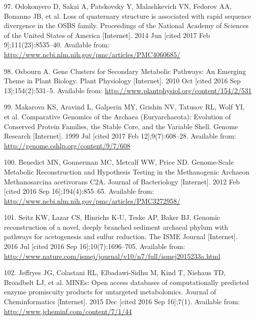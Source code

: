 \documentclass[12pt,twoside]{reedthesis}
\begin{document}
  \hypertarget{ref-odokonyero_loss_2014}{}
  97. Odokonyero D, Sakai A, Patskovsky Y, Malashkevich VN, Fedorov AA,
  Bonanno JB, et al. Loss of quaternary structure is associated with rapid
  sequence divergence in the OSBS family. Proceedings of the National
  Academy of Sciences of the United States of America {[}Internet{]}. 2014
  Jun {[}cited 2017 Feb 9{]};111(23):8535--40. Available from:
  \url{http://www.ncbi.nlm.nih.gov/pmc/articles/PMC4060685/}
  
  \hypertarget{ref-osbourn_gene_2010}{}
  98. Osbourn A. Gene Clusters for Secondary Metabolic Pathways: An
  Emerging Theme in Plant Biology. Plant Physiology {[}Internet{]}. 2010
  Oct {[}cited 2016 Sep 13{]};154(2):531--5. Available from:
  \url{http://www.plantphysiol.org/content/154/2/531}
  
  \hypertarget{ref-makarova_comparative_1999}{}
  99. Makarova KS, Aravind L, Galperin MY, Grishin NV, Tatusov RL, Wolf
  YI, et al. Comparative Genomics of the Archaea (Euryarchaeota):
  Evolution of Conserved Protein Families, the Stable Core, and the
  Variable Shell. Genome Research {[}Internet{]}. 1999 Jul {[}cited 2017
  Feb 12{]};9(7):608--28. Available from:
  \url{http://genome.cshlp.org/content/9/7/608}
  
  \hypertarget{ref-benedict_genome-scale_2012}{}
  100. Benedict MN, Gonnerman MC, Metcalf WW, Price ND. Genome-Scale
  Metabolic Reconstruction and Hypothesis Testing in the Methanogenic
  Archaeon Methanosarcina acetivorans C2A. Journal of Bacteriology
  {[}Internet{]}. 2012 Feb {[}cited 2016 Sep 16{]};194(4):855--65.
  Available from:
  \url{http://www.ncbi.nlm.nih.gov/pmc/articles/PMC3272958/}
  
  \hypertarget{ref-seitz_genomic_2016}{}
  101. Seitz KW, Lazar CS, Hinrichs K-U, Teske AP, Baker BJ. Genomic
  reconstruction of a novel, deeply branched sediment archaeal phylum with
  pathways for acetogenesis and sulfur reduction. The ISME Journal
  {[}Internet{]}. 2016 Jul {[}cited 2016 Sep 16{]};10(7):1696--705.
  Available from:
  \url{http://www.nature.com/ismej/journal/v10/n7/full/ismej2015233a.html}
  
  \hypertarget{ref-jeffryes_mines_2015}{}
  102. Jeffryes JG, Colastani RL, Elbadawi-Sidhu M, Kind T, Niehaus TD,
  Broadbelt LJ, et al. MINEs: Open access databases of computationally
  predicted enzyme promiscuity products for untargeted metabolomics.
  Journal of Cheminformatics {[}Internet{]}. 2015 Dec {[}cited 2016 Sep
  16{]};7(1). Available from: \url{http://www.jcheminf.com/content/7/1/44}
  
\end{document}
